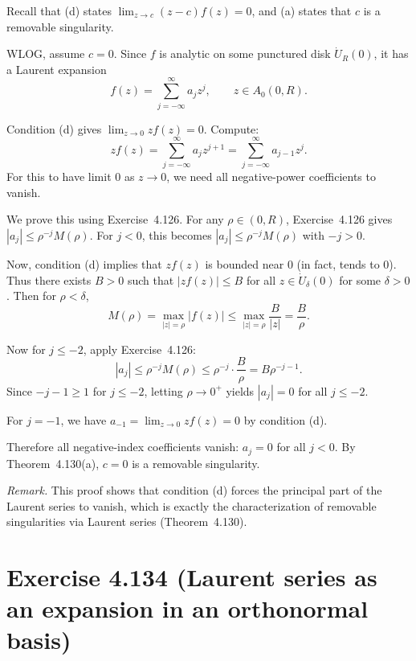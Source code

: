\documentclass{article}
\begin{document}
\begin{solution}
  Recall that (d) states $\lim_{z \to c} (z-c)f(z) = 0$, and (a) states that
  $c$ is a removable singularity.

  WLOG, assume $c = 0$. Since $f$ is analytic on some punctured disk
  $\dot{U}_R(0)$, it has a Laurent expansion
  \[
    f(z) = \sum_{j=-\infty}^{\infty} a_j z^j, \qquad z \in A_0(0, R).
  \]

  Condition (d) gives $\lim_{z \to 0} z f(z) = 0$. Compute:
  \[
    z f(z) = \sum_{j=-\infty}^{\infty} a_j z^{j+1}
    = \sum_{j=-\infty}^{\infty} a_{j-1} z^j.
  \]
  For this to have limit $0$ as $z \to 0$, we need all negative-power
  coefficients to vanish.

  We prove this using Exercise~4.126. For any $\rho \in (0, R)$,
  Exercise~4.126 gives $|a_j| \le \rho^{-j} M(\rho)$.
  For $j < 0$, this becomes $|a_j| \le \rho^{-j} M(\rho)$ with $-j > 0$.

  Now, condition (d) implies that $z f(z)$ is bounded near $0$ (in fact,
  tends to $0$). Thus there exists $B > 0$ such that
  $|z f(z)| \le B$ for all $z \in \dot{U}_{\delta}(0)$ for some $\delta > 0$.
  Then for $\rho < \delta$,
  \[
    M(\rho) = \max_{|z|=\rho} |f(z)|
    \le \max_{|z|=\rho} \frac{B}{|z|} = \frac{B}{\rho}.
  \]

  Now for $j \le -2$, apply Exercise~4.126:
  \[
    |a_j| \le \rho^{-j} M(\rho) \le \rho^{-j} \cdot \frac{B}{\rho}
    = B \rho^{-j-1}.
  \]
  Since $-j-1 \ge 1$ for $j \le -2$, letting $\rho \to 0^+$ yields
  $|a_j| = 0$ for all $j \le -2$.

  For $j = -1$, we have $a_{-1} = \lim_{z \to 0} z f(z) = 0$ by condition (d).

  Therefore all negative-index coefficients vanish: $a_j = 0$ for all
  $j < 0$. By Theorem~4.130(a), $c = 0$ is a removable singularity.

  \medskip
  \noindent\textit{Remark.} This proof shows that condition (d) forces the
  principal part of the Laurent series to vanish, which is exactly the
  characterization of removable singularities via Laurent series
  (Theorem~4.130).
\end{solution}

\section{Exercise 4.134 (Laurent series as an expansion in an orthonormal basis)}
\end{document}
